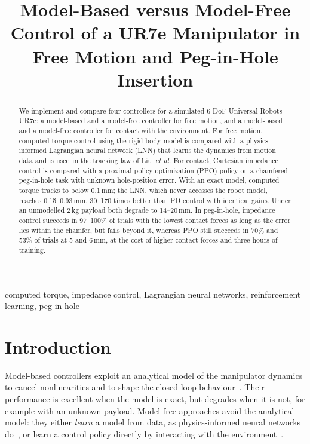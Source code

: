 \documentclass[conference]{IEEEtran}
\newcommand{\todo}[1]{\textcolor{red}{[TODO: #1]}}
\begin{document}
\title{Model-Based versus Model-Free Control of a UR7e Manipulator in Free Motion and Peg-in-Hole Insertion}

\author{
}

\maketitle

\begin{abstract}
We implement and compare four controllers for a simulated 6-DoF Universal Robots UR7e: a model-based and a model-free controller for free motion, and a model-based and a model-free controller for contact with the environment. For free motion, computed-torque control using the rigid-body model is compared with a physics-informed Lagrangian neural network (LNN) that learns the dynamics from motion data and is used in the tracking law of Liu~\emph{et al.} For contact, Cartesian impedance control is compared with a proximal policy optimization (PPO) policy on a chamfered peg-in-hole task with unknown hole-position error. With an exact model, computed torque tracks to below 0.1\,mm; the LNN, which never accesses the robot model, reaches 0.15--0.93\,mm, 30--170 times better than PD control with identical gains. Under an unmodelled 2\,kg payload both degrade to 14--20\,mm. In peg-in-hole, impedance control succeeds in 97--100\% of trials with the lowest contact forces as long as the error lies within the chamfer, but fails beyond it, whereas PPO still succeeds in 70\% and 53\% of trials at 5 and 6\,mm, at the cost of higher contact forces and three hours of training.
\end{abstract}

\begin{IEEEkeywords}
computed torque, impedance control, Lagrangian neural networks, reinforcement learning, peg-in-hole
\end{IEEEkeywords}

\section{Introduction}
Model-based controllers exploit an analytical model of the manipulator dynamics to cancel nonlinearities and to shape the closed-loop behaviour~\cite{siciliano2009,spong2006}. Their performance is excellent when the model is exact, but degrades when it is not, for example with an unknown payload. Model-free approaches avoid the analytical model: they either \emph{learn} a model from data, as physics-informed neural networks do~\cite{raissi2019,lutter2019delan,lutter2023,liu2024}, or learn a control policy directly by interacting with the environment~\cite{schulman2017,shahid2022}.
\end{document}
